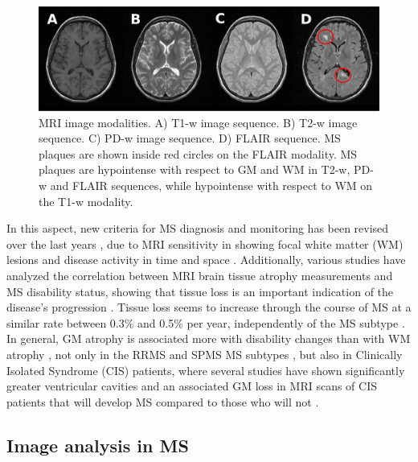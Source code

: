 \begin{figure}[top]
  \begin{center}
    \includegraphics[width=1\textwidth]{figures/figure_1.eps}
  \end{center}
    \caption[MRI image modalities]{MRI image modalities. A) T1-w image sequence. B) T2-w image sequence. C) PD-w image sequence. D) FLAIR sequence. MS plaques are shown inside red circles on the FLAIR modality. MS plaques are hypointense with respect to GM and WM in T2-w, PD-w and FLAIR sequences, while hypointense with respect to WM on the T1-w modality.}
    \label{mri_modalities}
\end{figure}

In this aspect, new criteria for MS diagnosis and monitoring has been revised over the last years \cite{Polman2011}, due to MRI sensitivity in showing focal white matter (WM) lesions and disease activity in time and space \cite{Filippi2011}. Additionally, various studies have analyzed the correlation between MRI brain tissue atrophy measurements and MS disability status, showing that tissue loss is an important indication of the disease's progression \cite{Chard2002, Filippi2013, Fisher2008, Rudick2009}. Tissue loss seems to increase through the course of MS at a similar rate between 0.3\% and 0.5\% per year, independently of the MS subtype \cite{DeStefano2010, Rudick2009}. In general, GM atrophy is associated more with disability changes than with WM atrophy \cite{Fisniku2008}, not only in the RRMS and SPMS MS subtypes \cite{Fisher2008, Rudick2009}, but also in Clinically Isolated Syndrome (CIS) patients, where several studies have shown significantly greater ventricular cavities and an associated GM loss in MRI scans of CIS patients that will develop MS compared to those who will not \cite{Ceccarelli2010,Filippi2013}.

\subsection{Image analysis in MS}
\label{subsec:image_analysis}

